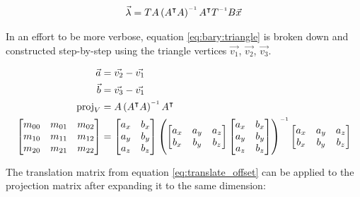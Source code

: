 \begin{align}
    \label{eq:bary:triangle}
    \vec{\lambda} = TA\left(A\transpose A\right)\inverse A\transpose T\inverse B \vec{x}
\end{align}

In  an effort to be more verbose, equation \ref{eq:bary:triangle} is broken down
and   constructed   step-by-step   using  the  triangle  vertices   $\vec{v_1}$,
$\vec{v_2}$, $\vec{v_3}$.

\begin{align*}
    \vec{a} &= \vec{v_2} - \vec{v_1} \\
    \vec{b} &= \vec{v_3} - \vec{v_1} \\
    \text{proj}_V &= A\left(A\transpose A\right)\inverse A\transpose \\
    \begin{bmatrix}
        m_{00} & m_{01} & m_{02} \\
        m_{10} & m_{11} & m_{12} \\
        m_{20} & m_{21} & m_{22} \\
    \end{bmatrix}
    &=  \begin{bmatrix}
            a_x & b_x \\
            a_y & b_y \\
            a_z & b_z \\
        \end{bmatrix}
        \left(
            \begin{bmatrix}
                a_x & a_y & a_z \\
                b_x & b_y & b_z \\
            \end{bmatrix}
            \begin{bmatrix}
                a_x & b_x \\
                a_y & b_y \\
                a_z & b_z \\
            \end{bmatrix}
        \right)\inverse
        \begin{bmatrix}
            a_x & a_y & a_z \\
            b_x & b_y & b_z \\
        \end{bmatrix}
\end{align*}

The translation matrix from equation \ref{eq:translate_offset} can be applied to
the projection matrix after expanding it to the same dimension:

